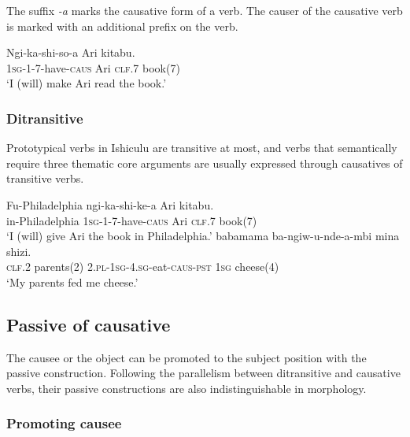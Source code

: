 The suffix \textit{-\textbeltl a} marks the causative form of a verb. The causer of the causative verb is marked with an additional prefix on the verb.

\begin{exe}
\ex
\gll Ngi-ka-shi-so-\textipa{\textbeltl}a Ari  kitabu. \\
\textsc{1sg}-\textsc{1}-\textsc{7}-have-\textsc{caus} Ari \textsc{clf}.7 book(7) \\
\trans `I (will) make Ari read the book.'
\end{exe}

\subsubsection{Ditransitive}

Prototypical verbs in Ishiculu are transitive at most, and verbs that semantically require three thematic core arguments are usually expressed through causatives of transitive verbs.

\begin{exe}
\ex
\gll Fu-Philadelphia ngi-ka-shi-ke-\textipa{\textbeltl}a Ari  kitabu. \\
in-Philadelphia \textsc{1sg}-\textsc{1}-\textsc{7}-have-\textsc{caus} Ari \textsc{clf}.7 book(7) \\
\trans `I (will) give Ari the book in Philadelphia.'
\ex
{} babamama ba-ngiw-u-nde-\textipa{\textbeltl}a-mbi mina shizi. \\
\textsc{clf.2} parents(2) \textsc{2.pl}-\textsc{1sg}-\textsc{4.sg}-eat-\textsc{caus}-\textsc{pst} \textsc{1sg} cheese(4) \\
\trans `My parents fed me cheese.'
\end{exe}

\subsection{Passive of causative}

The causee or the object can be promoted to the subject position with the passive construction. Following the parallelism between ditransitive and causative verbs, their passive constructions are also indistinguishable in morphology.

\subsubsection{Promoting causee}

